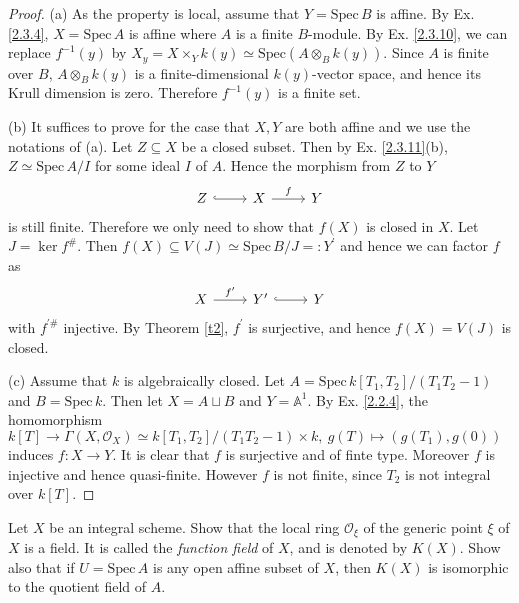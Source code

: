 \begin{proof}
	(a) As the property is local, assume that $Y=\mathrm{Spec}\,B$ is affine. By Ex. \ref{2.3.4}, $X=\mathrm{Spec}\,A$ is affine where $A$ is a finite $B$-module. By Ex. \ref{2.3.10}, we can replace $f^{-1}(y)$ by $X_y=X\times_Yk(y)\simeq\mathrm{Spec}(A\otimes_{B}k(y))$. Since $A$ is finite over $B$, $A\otimes_{B}k(y)$ is a finite-dimensional $k(y)$-vector space, and hence its Krull dimension is zero. Therefore $f^{-1}(y)$ is a finite set.
	
	(b) It suffices to prove for the case that $X,Y$ are both affine and we use the notations of (a). Let $Z\subseteq X$ be a closed subset. Then by Ex. \ref{2.3.11}(b), $Z\simeq\mathrm{Spec}\,A/I$ for some ideal $I$ of $A$. Hence the morphism from $Z$ to $Y$
	\begin{equation*}
		\begin{tikzcd}
			Z \arrow[r, hook] & X \arrow[r, "f"] & Y
		\end{tikzcd}
	\end{equation*}
	is still finite. Therefore we only need to show that $f(X)$ is closed in $X$. Let $J=\ker f^{\#}$. Then $f(X)\subseteq V(J)\simeq\mathrm{Spec}\,B/J=:Y^{\prime}$ and hence we can factor $f$ as
	\begin{equation*}
		\begin{tikzcd}
			X \arrow[r, "f^{\prime}"] & Y^{\prime} \arrow[r, hook] & Y
		\end{tikzcd}
	\end{equation*}
	with $f^{\prime\#}$ injective. By Theorem \ref{t2}, $f^{\prime}$ is surjective, and hence $f(X)=V(J)$ is closed.
	
	(c) Assume that $k$ is algebraically closed. Let $A=\mathrm{Spec}\,k[T_1,T_2]/(T_1T_2-1)$ and $B=\mathrm{Spec}\,k$. Then let $X=A\sqcup B$ and $Y=\mathbb{A}^1$. By Ex. \ref{2.2.4}, the homomorphism $k[T]\rightarrow \Gamma(X,\mathcal{O}_X)\simeq k[T_1,T_2]/(T_1T_2-1)\times k,\ g(T)\mapsto(g(T_1),g(0))$ induces $f:X\to Y$. It is clear that $f$ is surjective and of finte type. Moreover $f$ is injective and hence quasi-finite. However $f$ is not finite, since $T_2$ is not integral over $k[T]$.
\end{proof}
\begin{exe}
	\label{2.3.6}
	Let $X$ be an integral scheme. Show that the local ring $\mathcal{O}_{\xi}$ of the generic point $\xi$ of $X$ is a field. It is called the \emph{function field} of $X$, and is denoted by $K(X)$. Show also that if $U=\mathrm{Spec}\,A$ is any open affine subset of $X$, then $K(X)$ is isomorphic to the quotient field of $A$.
\end{exe}
